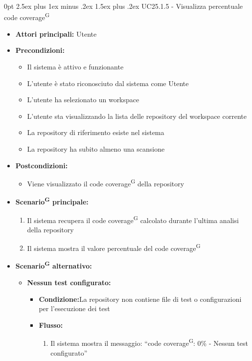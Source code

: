 \documentclass[a4paper, 11pt]{article}
\makeatletter
\renewcommand\paragraph{\@startsection{paragraph}{4}
  {0pt}
  {2.5ex plus 1ex minus .2ex}
  {1.5ex plus .2ex}
  {\normalfont\normalsize\bfseries\color{AccentDark}}}
\makeatother
\begin{document}
\paragraph{UC25.1.5 - Visualizza percentuale code coverage\textsuperscript{G}} \label{UC25.1.5}
\begin{itemize}
	\item \textbf{Attori principali:} Utente
	\item \textbf{Precondizioni:} 
	\begin{itemize}
		\item Il sistema è attivo e funzionante
		\item L'utente è stato riconosciuto dal sistema come Utente
		\item L'utente ha selezionato un workspace 
		\item L'utente sta visualizzando la lista delle repository del workspace corrente
		\item La repository di riferimento esiste nel sistema
		\item La repository ha subito almeno una scansione 
	\end{itemize}
	\item \textbf{Postcondizioni:} 
	\begin{itemize}
		\item Viene visualizzato il code coverage\textsuperscript{G} della repository
	\end{itemize}
	\item \textbf{Scenario\textsuperscript{G} principale:}
	\begin{enumerate}
		\item Il sistema recupera il code coverage\textsuperscript{G} calcolato durante l'ultima analisi della repository 
		\item Il sistema mostra il valore percentuale del code coverage\textsuperscript{G}
	\end{enumerate}
		\item \textbf{Scenario\textsuperscript{G} alternativo:}
	\begin{itemize}
		\item \textbf{Nessun test configurato:} 
			\begin{itemize}
				\item \textbf{Condizione:}La repository non contiene file di test o configurazioni per l'esecuzione dei test
				\item \textbf{Flusso:} 
				\begin{enumerate}
					\item Il sistema mostra il messaggio: “code coverage\textsuperscript{G}: 0\% - Nessun test configurato”

\end{enumerate}
\end{itemize}
\end{itemize}
\end{itemize}
\end{document}

